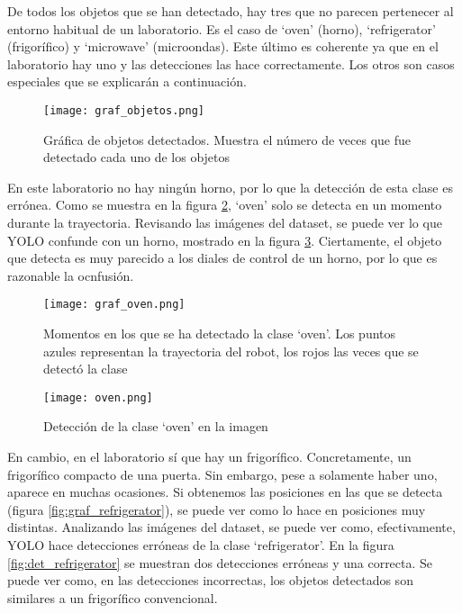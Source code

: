 De todos los objetos que se han detectado, hay tres que no parecen pertenecer al entorno habitual de un laboratorio. Es el caso de `oven' (horno), `refrigerator' (frigorífico) y `microwave' (microondas). Este último es coherente ya que en el laboratorio hay uno y las detecciones las hace correctamente. Los otros son casos especiales que se explicarán a continuación.\\

\begin{figure}[h]
	\begin{center} 
		\texttt{[image: graf\_objetos.png]}
	\end{center}
	\caption{Gráfica de objetos detectados. Muestra el número de veces que fue detectado cada uno de los objetos}
	\label{fig:graf_objetos}
\end{figure}

En este laboratorio no hay ningún horno, por lo que la detección de esta clase es errónea. Como se muestra en la figura \ref{fig:graf_oven}, `oven' solo se detecta en un momento durante la trayectoria. Revisando las imágenes del dataset, se puede ver lo que YOLO confunde con un horno, mostrado en la figura \ref{fig:det_oven}. Ciertamente, el objeto que detecta es muy parecido a los diales de control de un horno, por lo que es razonable la ocnfusión.\\

\begin{figure}[h]
	\begin{center} 
		\texttt{[image: graf\_oven.png]}
	\end{center}
	\caption{Momentos en los que se ha detectado la clase `oven'. Los puntos azules representan la trayectoria del robot, los rojos las veces que se detectó la clase}
	\label{fig:graf_oven}
\end{figure}

\begin{figure}[h]
	\begin{center} 
		\texttt{[image: oven.png]}
	\end{center}
	\caption{Detección de la clase `oven' en la imagen}
	\label{fig:det_oven}
\end{figure}

En cambio, en el laboratorio sí que hay un frigorífico. Concretamente, un frigorífico compacto de una puerta. Sin embargo, pese a solamente haber uno, aparece en muchas ocasiones. Si obtenemos las posiciones en las que se detecta (figura \ref{fig:graf_refrigerator}), se puede ver como lo hace en posiciones muy distintas. Analizando las imágenes del dataset, se puede ver como, efectivamente, YOLO hace detecciones erróneas de la clase `refrigerator'. En la figura \ref{fig:det_refrigerator} se muestran dos detecciones erróneas y una correcta. Se puede ver como, en las detecciones incorrectas, los objetos detectados son similares a un frigorífico convencional.\\

